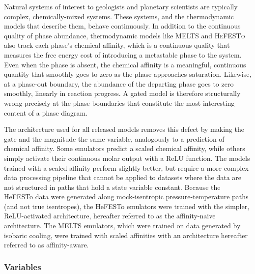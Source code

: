 Natural systems of interest to geologists and planetary scientists are typically complex, chemically-mixed systems. These systems, and the thermodynamic models that describe them, 
behave continuously. In addition to the continuous quality of phase abundance, thermodynamic models like \textsc{MELTS} and \textsc{HeFESTo} also track each phase's chemical affinity, 
which is a continuous quality that measures the free energy cost of introducing a metastable phase to the system. 
Even when the phase is absent, the chemical affinity is a meaningful, continuous quantity that smoothly goes to zero as the phase approaches saturation. 
Likewise, at a phase-out boundary, the abundance of the departing phase goes to zero smoothly, linearly in reaction progress. A gated model is
therefore structurally wrong precisely at the phase boundaries that constitute the most
interesting content of a phase diagram.

The architecture used for all released models removes this defect by making the gate
and the magnitude the same variable, analogously to a prediction of chemical affinity. Some emulators predict a scaled chemical affinity, while 
others simply activate their continuous molar output with a ReLU function. The models trained with a scaled affinity perform slightly better, 
but require a more complex data processing pipeline that cannot be applied to datasets where the data are not structured in paths that hold 
a state variable constant. Because the HeFESTo data were generated along mock-isentropic pressure-temperature paths (and not true isentropes), 
the HeFESTo emulators were trained with the simpler, ReLU-activated architecture, hereafter referred to as the affinity-naive architecture. 
The MELTS emulators, which were trained on data generated by isobaric cooling, were trained with scaled affinities with an architecture 
hereafter referred to as affinity-aware.

\subsubsection{Variables}

